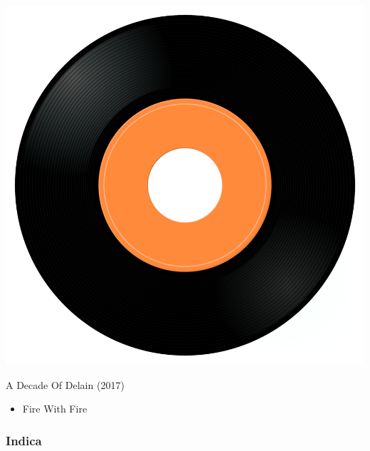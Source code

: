 \begin{minipage}[t]{0.25\textwidth}\vspace{0pt}
\captionsetup{type=figure}
\includegraphics[width=\textwidth]{Images/cover.png}
\caption*{A Decade Of Delain  (2017)}
\end{minipage}
\begin{minipage}[t]{0.25\textwidth}\vspace{0pt}
\begin{itemize}[nosep,leftmargin=1em,labelwidth=*,align=left]
	\setlength{\itemsep}{0pt}
	\item Fire With Fire 
\end{itemize}
\end{minipage}

\subsubsection{Indica}

